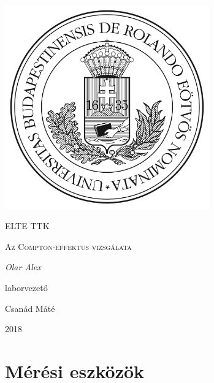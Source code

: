 \documentclass[a4paper,12pt]{article}
\begin{document}
\linespread{1.2}

\begin{titlepage}

	\centering
	\includegraphics[width=0.66\textwidth]{elte.jpg}\par\vspace{1cm}
	{\scshape\LARGE ELTE TTK \par}
	\vspace{3cm}
	{\scshape\Large Az Compton-effektus vizsgálata\par}
	\vspace{1cm}
	{\large\itshape Olar Alex\par}
	\vspace{3cm}
	laborvezető\par
	\vspace{0.3cm}
	{\Large Csanád Máté}
	\vfill
	{\large 2018 \par}
	
\end{titlepage}

\begin{abstract}
\par A mérés célja az volt, hogy a kiértékelés során a lehető legpontosabban járjunk el a számolások közben, hibabecslésen alkalmával. A Compton-effektus tulajdonságait vizsgáltuk. Az energia és a hatáskereszmetszet elméleti szögfüggését vettük alapul a kiértékelés során.
\end{abstract}

\vfill

\tableofcontents

\newpage

\section{Mérési eszközök}
\end{document}
